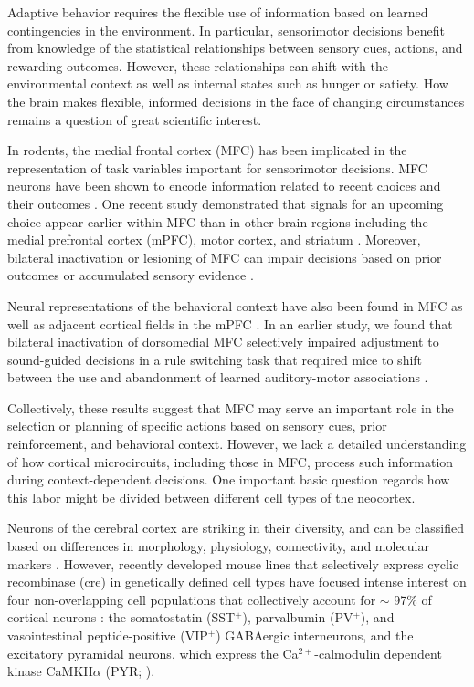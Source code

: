 
Adaptive behavior requires the flexible use of information based on learned contingencies in the environment. In particular, sensorimotor decisions benefit from knowledge of the statistical relationships between sensory cues, actions, and rewarding outcomes. However, these relationships can shift with the environmental context as well as internal states such as hunger or satiety. How the brain makes flexible, informed decisions in the face of changing circumstances remains a question of great scientific interest.

In rodents, the medial frontal cortex (MFC) has been implicated in the representation of task variables important for sensorimotor decisions. MFC neurons have been shown to encode information related to recent choices and their outcomes \citep{sul2011role,yuan2015cortical,siniscalchi2019enhanced,mao2019cortical}. One recent study demonstrated that signals for an upcoming choice appear earlier within MFC than in other brain regions including the medial prefrontal cortex (mPFC), motor cortex, and striatum \citep{sul2011role}. Moreover, bilateral inactivation or lesioning of MFC can impair decisions based on prior outcomes \citep{sul2011role} or accumulated sensory evidence \citep{erlich2015distinct}. 

Neural representations of the behavioral context have also been found in MFC \citep{durstewitz2010abrupt,hyman2012contextual,siniscalchi2016fast} as well as adjacent cortical fields in the mPFC \citep{rich2009rat}. In an earlier study, we found that bilateral inactivation of dorsomedial MFC selectively impaired adjustment to sound-guided decisions in a rule switching task that required mice to shift between the use and abandonment of learned auditory-motor associations \citep{siniscalchi2016fast}. 

Collectively, these results suggest that MFC may serve an important role in the selection or planning of specific actions based on sensory cues, prior reinforcement, and behavioral context. However, we lack a detailed understanding of how cortical microcircuits, including those in MFC, process such information during context-dependent decisions. One important basic question regards how this labor might be divided between different cell types of the neocortex. 

Neurons of the cerebral cortex are striking in their diversity, and can be classified based on differences in morphology, physiology, connectivity, and molecular markers \citep{connors1990intrinsic,kubota1994three,kawaguchi1995physiological,tremblay2016gabaergic,huang2019diversity}. However, recently developed mouse lines that selectively express cyclic recombinase (cre) in genetically defined cell types \citep{taniguchi11} have focused intense interest on four non-overlapping cell populations that collectively account for $\sim$ 97\% of cortical neurons \citep{tremblay2016gabaergic}: the somatostatin (SST$^+$), parvalbumin (PV$^+$), and vasointestinal peptide-positive (VIP$^+$) GABAergic interneurons, and the excitatory pyramidal neurons, which express the Ca$^{2+}$-calmodulin dependent kinase CaMKII$\alpha$ (PYR; \citep{jones1994alpha,wang2013distribution}).

